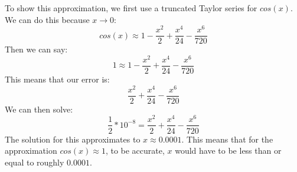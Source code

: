 To show this approximation, we first use a truncated Taylor series for $cos(x)$. We can do this because $x \rightarrow 0$:
$$
cos(x) \approx 1 - \frac{x^2}{2}+\frac{x^4}{24}-\frac{x^6}{720}
$$
Then we can say:
$$
1 \approx 1 - \frac{x^2}{2}+\frac{x^4}{24}-\frac{x^6}{720}
$$
This means that our error is:
$$
\frac{x^2}{2}+\frac{x^4}{24}-\frac{x^6}{720}
$$
We can then solve:
$$
\frac{1}{2} * 10^{-8} = \frac{x^2}{2}+\frac{x^4}{24}-\frac{x^6}{720}
$$
The solution for this approximates to $x \approx 0.0001$. This means that for the approximation $cos(x) \approx 1$, to be accurate, $x$ would have to be less than or equal to roughly $0.0001$.
